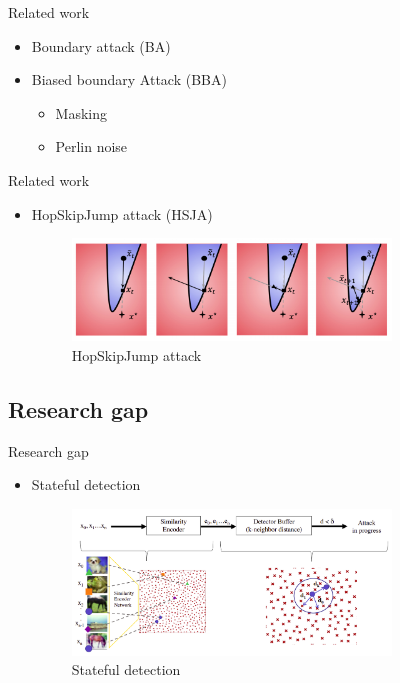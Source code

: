 \documentclass[11pt,t]{beamer}
\begin{document}
\begin{frame}{Related work}
\begin{itemize}
	\item Boundary attack (BA)
	\item Biased boundary Attack (BBA)
	\begin{itemize}
		\item Masking
		\item Perlin noise
	\end{itemize}
\end{itemize}
\end{frame}

\begin{frame}{Related work}
\begin{itemize}
	\item HopSkipJump attack (HSJA)
	\vspace{6pt}
	\begin{figure}
	\centering
	\includegraphics[width=0.8\textwidth]{graphics/hsj_attack.png}
	\caption{HopSkipJump attack \cite{chen2020hopskipjumpattack}\label{fig:hsj_attack}}
	\footnotesize
	\flushleft
	\end{figure}
\end{itemize}
\end{frame}

\subsection{Research gap}
\begin{frame}{Research gap}
\begin{itemize}
	\item Stateful detection
	\begin{figure}
	\centering
	\includegraphics[width=0.8\textwidth]{graphics/stateful_detection.png}
	\caption{Stateful detection \cite{chen2019stateful}\label{fig:stateful_detection}}
	\footnotesize
	\flushleft
	\end{figure}
\end{itemize}
\end{frame}
\end{document}
